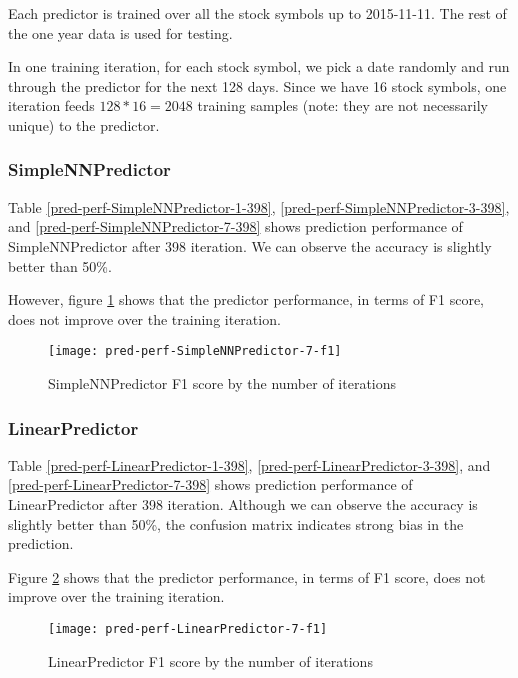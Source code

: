 \documentclass[twocolumn,10pt]{asme2ej}
\begin{document}
Each predictor is trained over all the stock symbols up to
2015-11-11. The rest of the one year data is used for testing.

In one training iteration, for each stock symbol, we pick a date
randomly and run through the predictor for the next 128 days. Since we
have 16 stock symbols, one iteration feeds $128 * 16 = 2048$ training
samples (note: they are not necessarily unique) to the predictor.


\subsubsection{SimpleNNPredictor}

Table \ref{pred-perf-SimpleNNPredictor-1-398}, \ref{pred-perf-SimpleNNPredictor-3-398}, and
\ref{pred-perf-SimpleNNPredictor-7-398} shows prediction performance of
SimpleNNPredictor after 398 iteration. We can observe the accuracy is slightly better than 50\%.

However, figure \ref{pred-perf-SimpleNNPredictor-7-f1} shows that the predictor
performance, in terms of F1 score, does not improve over the training
iteration. 

\begin{figure}
  \centering
  \texttt{[image: pred-perf-SimpleNNPredictor-7-f1]}
  \caption{SimpleNNPredictor F1 score by the number of iterations}
  \label{pred-perf-SimpleNNPredictor-7-f1}
\end{figure}

\subsubsection{LinearPredictor}

Table \ref{pred-perf-LinearPredictor-1-398},
\ref{pred-perf-LinearPredictor-3-398}, and
\ref{pred-perf-LinearPredictor-7-398} shows prediction performance of
LinearPredictor after 398 iteration. Although we can observe the
accuracy is slightly better than 50\%, the confusion matrix indicates
strong bias in the prediction.

Figure \ref{pred-perf-LinearPredictor-7-f1} shows that the predictor
performance, in terms of F1 score, does not improve over the training
iteration. 

\begin{figure}
  \centering
  \texttt{[image: pred-perf-LinearPredictor-7-f1]}
  \caption{LinearPredictor F1 score by the number of iterations}
  \label{pred-perf-LinearPredictor-7-f1}
\end{figure}
\end{document}
